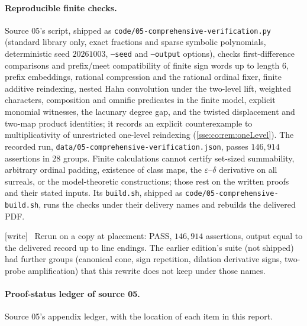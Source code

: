 \documentclass[11pt,a4paper]{article}
\numberwithin{equation}{section}
\theoremstyle{plain}
\theoremstyle{definition}
\theoremstyle{remark}
\newcommand{\code}[1]{\texttt{\small #1}}
\newcommand{\fn}[1]{\nolinkurl{#1}}%
\newcommand{\wtag}{\textup{\textsf{[write]}}}%
\newenvironment{wnote}{\par\smallskip\noindent\wtag\ }{\par\smallskip}
\begin{document}
\paragraph{Reproducible finite checks.} Source 05's script, shipped as
\fn{code/05-comprehensive-verification.py} (standard library only, exact
fractions and sparse symbolic polynomials, deterministic seed $20261003$,
\code{--seed} and \code{--output} options), checks first-difference
comparisons and prefix/meet compatibility of finite sign words up to length
$6$, prefix embeddings, rational compression and the rational ordinal fixer,
finite additive reindexing, nested Hahn convolution under the two-level
lift, weighted characters, composition and omnific predicates in the finite
model, explicit monomial witnesses, the lacunary degree gap, and the twisted
displacement and two-map product identities; it records an explicit
counterexample to multiplicativity of unrestricted one-level reindexing
(\cref{sse:co:rem:oneLevel}). The recorded run,
\fn{data/05-comprehensive-verification.json}, passes $146{,}914$ assertions
in 28 groups. Finite calculations cannot certify set-sized summability,
arbitrary ordinal padding, existence of class maps, the
$\varepsilon$--$\delta$ derivative on all surreals, or the model-theoretic
constructions; those rest on the written proofs and their stated inputs. Its
\code{build.sh}, shipped as \fn{code/05-comprehensive-build.sh}, runs the
checks under their delivery names and rebuilds the delivered PDF.
\begin{wnote}
Rerun on a copy at placement: PASS, $146{,}914$ assertions, output equal to
the delivered record up to line endings. The earlier edition's suite (not
shipped) had further groups (canonical cone, sign repetition, dilation
derivative signs, two-probe amplification) that this rewrite does not keep
under those names.
\end{wnote}

\paragraph{Proof-status ledger of source 05.}\label{sse:co:sec:ledger}
Source 05's appendix ledger, with the location of each item in this report.
\end{document}
